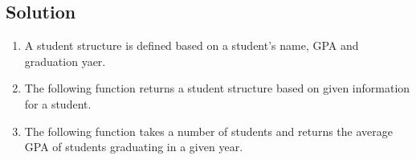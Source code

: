 
\subsection*{Solution}

\begin{enumerate}

\item A student structure is defined based on a student's name, GPA and graduation yaer.
\lstset{language=c,tabsize=4}


\item The following function returns a student structure based on given information for a student.
\lstset{language=c,tabsize=4}


\item The following function takes a number of students and returns the average GPA of students graduating in a given year.
\lstset{language=c,tabsize=4}


\end{enumerate}
